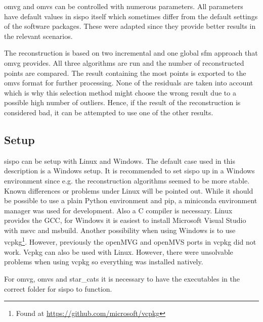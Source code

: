\gls{omvg} and \gls{omvs} can be controlled with numerous parameters. All parameters have default values in \gls{sispo} itself which sometimes differ from the default settings of the software packages. These were adapted since they provide better results in the relevant scenarios.

The reconstruction is based on two incremental and one global \gls{sfm} approach that \gls{omvg} provides. All three algorithms are run and the number of reconstructed points are compared. The result containing the most points is exported to the \gls{omvs} format for further processing. None of the residuals are taken into account which is why this selection method might choose the wrong result due to a possible high number of outliers. Hence, if the result of the reconstruction is considered bad, it can be attempted to use one of the other results.

\subsection{Setup} \label{sec:setup}
\gls{sispo} can be setup with Linux and Windows. The default case used in this description is a Windows setup. It is recommended to set \gls{sispo} up in a Windows environment since e.g. the reconstruction algorithms seemed to be more stable. Known differences or problems under Linux will be pointed out. While it should be possible to use a plain Python environment and pip, a miniconda environment manager was used for development. Also a C compiler is necessary. Linux provides the GCC, for Windows it is easiest to install Microsoft Visual Studio with \gls{msvc} and \gls{msbuild}. Another possibility when using Windows is to use vcpkg\footnote{Found at \url{https://github.com/microsoft/vcpkg}}. However, previously the openMVG and openMVS ports in vcpkg did not work. Vcpkg can also be used with Linux. However, there were unsolvable problems when using vcpkg so everything was installed natively.

For \gls{omvg}, \gls{omvs} and star\_cats it is necessary to have the executables in the correct folder for \gls{sispo} to function.\newline

